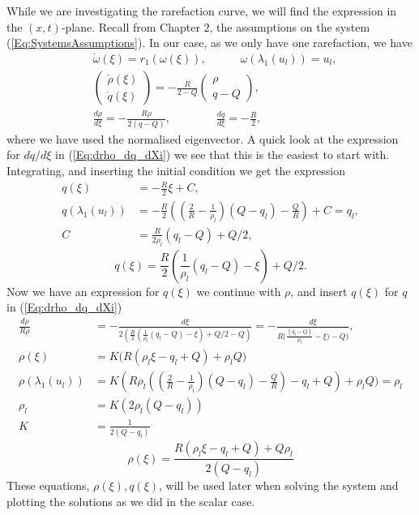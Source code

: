 \documentclass[10pt]{article}
\numberwithin{equation}{section}
\begin{document}
While we are investigating the rarefaction curve, we will find the expression in the $(x,t)$-plane. Recall from Chapter $2$, the assumptions on the system (\ref{Eq:SystemsAssumptions}). In our case, as we only have one rarefaction, we have 
\begin{align}
    & \dot \omega(\xi) = r_1( \omega(\xi)),  \quad \quad \quad \omega(\lambda_1(u_l)) = u_l, \nonumber \\
    &\begin{pmatrix} \dot \rho(\xi) \\ \dot q(\xi) \end{pmatrix} = - \frac{R}{2-Q}\begin{pmatrix}  \rho \\ q - Q\end{pmatrix}, \nonumber\\
    & \frac{d\rho}{d\xi} = - \frac{R \rho}{2(q-Q)}, \quad \quad  \quad \quad  \frac{dq}{d\xi} = -\frac{R}{2}, \label{Eq:drho_dq_dXi}
\end{align}
where we have used the normalised eigenvector. A quick look at the expression for $dq/d\xi$ in (\ref{Eq:drho_dq_dXi}) we see that this is the easiest to start with. Integrating, and inserting the initial condition we get the expression
\begin{align*}
    q(\xi) &= -\frac{R}{2}\xi + C, \\
    q(\lambda_1(u_l)) &= -\frac{R}{2}((\frac{2}{R}- \frac{1}{\rho_l})(Q-q_l) -  \frac{Q}{R}) + C = q_l, \\
    C &= \frac{R}{2\rho_l}(q_l - Q) + Q/2, 
\end{align*}
\begin{equation}
    q(\xi) = \frac{R}{2}( \frac{1}{\rho_l}(q_l - Q) - \xi ) + Q/2 . \label{Eq:q(xi)}
\end{equation}
Now we have an expression for $q(\xi)$ we continue with $\rho$, and insert $q(\xi)$ for $q$ in (\ref{Eq:drho_dq_dXi})
\begin{align*}
    \frac{d\rho}{R \rho} &= -\frac{d \xi}{2( \frac{R}{2}( \frac{1}{\rho_l}(q_l - Q) - \xi ) + Q/2 -Q) } = -\frac{d \xi}{R \big( \frac{(q_l - Q) }{\rho_l}- \xi \big) -Q) } ,\\
                \rho(\xi) &= K \big( R (\rho_l \xi - q_l +Q) + \rho_l Q \big) \\
    \rho(\lambda_1(u_l)) &= K( R \rho_l ((\frac{2}{R}- \frac{1}{\rho_l})(Q-q_l) -  \frac{Q}{R}) - q_l +Q) + \rho_l Q) = \rho_l \\
    \rho_l &= K( 2 \rho_l (Q-q_l )) \\
    K &= \frac{1}{2(Q-q_l)}
\end{align*}
\begin{equation}
    \rho(\xi) = \frac{R(\rho_l \xi - q_l + Q) + Q \rho_l}{2(Q-q_l)} \label{Eq:rho(xi)}
\end{equation}
These equations, $\rho(\xi), q(\xi)$, will be used later when solving the system and plotting the solutions as we did in the scalar case. 
\end{document}
